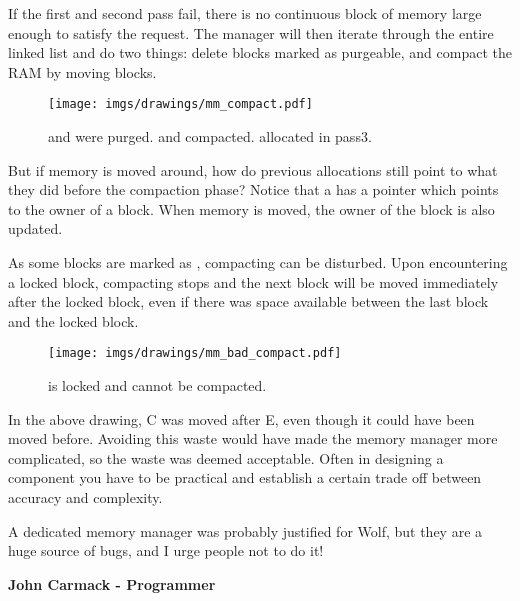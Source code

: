 \documentclass[book.tex]{subfiles}
\begin{document}
 \par
 If the first and second pass fail, there is no continuous block of memory large enough to satisfy the request. The manager will then iterate through the entire linked list and do two things: delete blocks marked as purgeable, and compact the RAM by moving blocks.
  \par
\begin{figure}[H]
\centering
 \texttt{[image: imgs/drawings/mm\_compact.pdf]}
  \caption{ and  were purged.  and  compacted.  allocated in pass3.}
 \end{figure}
 \par
But if memory is moved around, how do previous allocations still point to what they did before the compaction phase? Notice that a  has a  pointer which points to the owner of a block.  When memory is moved, the owner of the block is also updated.\\
\par
As some blocks are marked as , compacting can be disturbed. Upon encountering a locked block, compacting stops and the next block will be moved immediately after the locked block, even if there was space available between the last block and the locked block.\\
   \par
\begin{figure}[H]
\centering
 \texttt{[image: imgs/drawings/mm\_bad\_compact.pdf]}
 \caption{ is locked and cannot be compacted.}
 \end{figure}
 \par
  In the above drawing, C was moved after E, even though it could have been moved before. Avoiding this waste would have made the memory manager more complicated, so the waste was deemed acceptable. Often in designing a component you have to be practical and establish a certain trade off between accuracy and complexity.\\
  \par



\begin{fancyquotes}
A dedicated memory manager was probably justified for Wolf, but they are a huge source of bugs, and I urge people not to do it!\\
\par
\textbf{John Carmack - Programmer}
 \end{fancyquotes}
\end{document}
